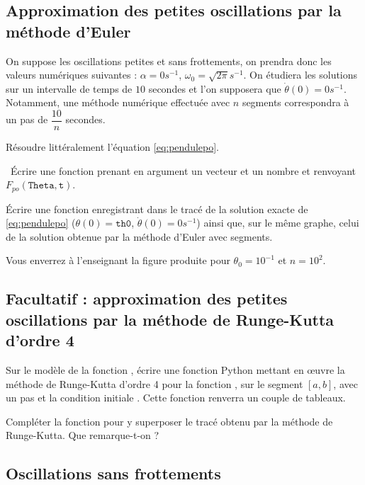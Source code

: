 \subsection{Approximation des petites oscillations par la méthode d'Euler}

On suppose les oscillations petites et sans frottements, on prendra donc les valeurs numériques suivantes : $\alpha = 0 s^{-1}$, $\omega_0 = \sqrt{2\pi} s^{-1}$. 
On étudiera les solutions sur un intervalle de temps de $10$ secondes et l'on supposera que $\dot{\theta}(0) = 0s^{-1}$. 
Notamment, une méthode numérique effectuée avec $n$ segments correspondra à un pas de $\dfrac{10}{n}$ secondes. 

\question{} Résoudre littéralement l'équation \eqref{eq:pendulepo}.

\medskip

\question\ \'Ecrire une fonction  prenant en argument un vecteur  et un nombre  et renvoyant $F_{po}(\texttt{Theta},\texttt{t})$.

\medskip

\question{\label{qu:tracepo}} \'Ecrire une fonction  enregistrant dans  le tracé de la solution exacte de \eqref{eq:pendulepo} ($\theta(0) = \texttt{th0}$, $\dot{\theta}(0) = 0s^{-1}$) ainsi que, sur le même graphe, celui de la solution obtenue par la méthode d'Euler avec  segments.  

Vous enverrez à l'enseignant la figure produite pour $\theta_0 = 10^{-1}$ et $n=10^2$. 

\subsection{Facultatif : approximation des petites oscillations par la méthode de Runge-Kutta d'ordre 4}

\question{} Sur le modèle de la fonction , écrire une fonction Python  mettant en {\oe}uvre la méthode de Runge-Kutta d'ordre 4 pour la fonction , sur le segment $[a,b]$, avec un pas  et la condition initiale . 
  Cette fonction renverra un couple de tableaux. 
  
\medskip
  
\question{} Compléter la fonction  pour y superposer le tracé obtenu par la méthode de Runge-Kutta.  Que remarque-t-on ?

\subsection{Oscillations sans frottements}

